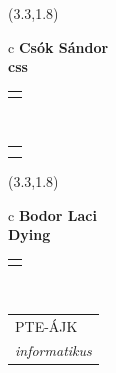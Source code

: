 \documentclass[11pt]{article}
\begin{document}
\makebox(3.3,1.8){
  \renewcommand\arraystretch{1.3}
  \begin{tabular}[c]{c}
    \hspace{8.5mm}
    \LARGE\bf{ Csók Sándor }\\
    \hspace{8.5mm}
    \Large{ css }\\
    \renewcommand\arraystretch{3}
    \begin{tabular}[c]{c}
      \centering
      \fontfamily{phv}\selectfont{
        \textbf{
          \textsc{
            \scriptsize{
            \color{Dark}{ Ismerkedő }\color{Dark}{ Webmester }\color{Bright}{ Sminkmester }\color{Bright}{ Programozó }
            }
          }
        }
      }
    \end{tabular}
    \\
    \renewcommand\arraystretch{1}
    \begin{tabular}{p{3.3in}}
      \hspace{.7cm}\\
      \hspace{.7cm}\emph{  }\\
    \end{tabular}
  \end{tabular}
}

\makebox(3.3,1.8){
  \renewcommand\arraystretch{1.3}
  \begin{tabular}[c]{c}
    \hspace{8.5mm}
    \LARGE\bf{ Bodor Laci }\\
    \hspace{8.5mm}
    \Large{ Dying }\\
    \renewcommand\arraystretch{3}
    \begin{tabular}[c]{c}
      \centering
      \fontfamily{phv}\selectfont{
        \textbf{
          \textsc{
            \scriptsize{
            \color{Dark}{ Ismerkedő }\color{Bright}{ Webmester }\color{Bright}{ Sminkmester }\color{Bright}{ Programozó }
            }
          }
        }
      }
    \end{tabular}
    \\
    \renewcommand\arraystretch{1}
    \begin{tabular}{p{3.3in}}
      \hspace{.7cm}PTE-ÁJK\\
      \hspace{.7cm}\emph{ informatikus }\\
    \end{tabular}
  \end{tabular}
}
\end{document}
